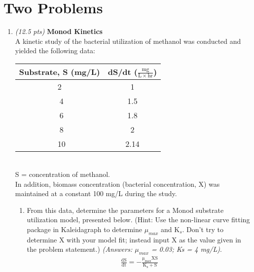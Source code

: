 \documentclass[12pt,letterpaper]{article}
\begin{document}
\section *{Two Problems}

\begin{enumerate}


\item \emph{(12.5 pts)} \textbf{\large{Monod Kinetics}}\\
A kinetic study of the bacterial utilization of methanol was conducted and yielded the following data:\\

\begin{minipage}{\linewidth}
\centering
\begin{tabular}{|c|c|}\toprule[1.25pt]
\bf Substrate, S (mg/L)	& \bf dS/dt ($\mathrm{\frac{mg}{L\times hr}}$)	\\\midrule
2	& 1\\ \hline\
4	& 1.5\\ \hline\
6	& 1.8\\ \hline\
8	& 2\\ \hline\
10 & 2.14\\
\bottomrule[1.25pt]

\end {tabular}\par
\end{minipage}\\

S = concentration of methanol.\\

In addition, biomass concentration (bacterial concentration, X) was maintained at a constant 100 mg/L during the study. 

\begin{enumerate}



\item From this data, determine the parameters for a Monod substrate utilization model, presented below. (Hint: Use the non-linear curve fitting package in Kaleidagraph to determine $\mu_{max}$ and K$_s$.  Don't try to determine X with your model fit; instead input X as the value given in the problem statement.) \emph{(Answers: $\mu_{max}$ = 0.03; Ks = 4 mg/L)}.\\

\begin{align*}
\mathrm{\frac{dS}{dt} = -\frac{\mu_{max}XS}{K_s + S}}
\end{align*}



\end{enumerate}
\end{enumerate}
\end{document}
